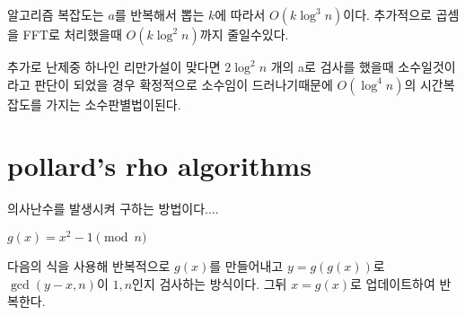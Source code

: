 알고리즘 복잡도는 $a$를 반복해서 뽑는 $k$에 따라서 $O(k \log^3 n)$이다. 추가적으로 곱셈을 FFT로 처리했을때 $O(k \log^2 n)$까지 줄일수있다.

추가로 난제중 하나인 리만가설이 맞다면 $2\log^2 n$ 개의 a로 검사를 했을때 소수일것이라고 판단이 되었을 경우 확정적으로 소수임이 드러나기때문에 $O(\log^4 n)$의 시간복잡도를 가지는 소수판별법이된다.

\section{pollard's rho algorithms}

의사난수를 발생시켜 구하는 방법이다....


$ g(x)  = x ^2-1 \pmod{n} $

다음의 식을 사용해 반복적으로 $g(x)$를 만들어내고 
$y = g(g(x))$로 $\gcd(y-x, n)$이 $1,n$인지 검사하는 방식이다. 그뒤 $x = g(x)$로 업데이트하여 반복한다.


